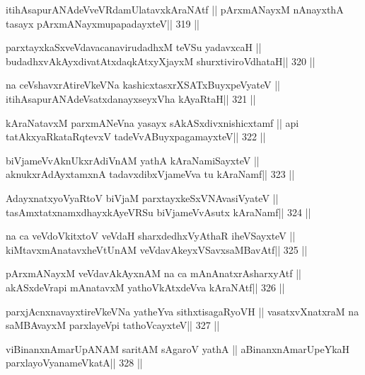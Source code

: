 \begin{shl}
itihAsapurANAdeVveVRdamUlatavxkAraNAtf ||
pArxmANayxM nAnayxthA tasayx pArxmANayxmupapadayxteV\hfill || 319 ||
\end{shl}

\begin{shl}
parxtayxkaSxveVdavacanavirudadhxM teVSu yadavxcaH ||
budadhxvAkAyxdivatAtxdaqkAtxyXjayxM shurxtiviroVdhataH\hfill || 320 ||
\end{shl}

\begin{shl}
na ceVshavxrAtireVkeVNa kashicxtasxrXSATx\s BuyxpeVyateV ||
itihAsapurANAdeVsatxdanayxseyxVha kAyaRtaH\hfill || 321 ||
\end{shl}

\begin{shl}
kAraNatavxM parxmANeVna yasayx sAkASxdivxnishicxtamf ||
api tatAkxyaRkataRqtevxV tadeVvABuyxpagamayxteV\hfill || 322 ||
\end{shl}

\begin{shl}
biVjameVvAknUkxrAdiVnAM yathA kAraNamiSayxteV ||
aknukxrAdAyxtamxnA tadavxdibxVjameVva tu kAraNamf\hfill || 323 ||
\end{shl}

\begin{shl}
AdayxnatxyoVyaRtoV biVjaM parxtayxkeSxVNAvasiVyateV ||
tasAmxtatxnamxdhayxkAyeVRSu biVjameVvAsutx kAraNamf\hfill || 324 ||
\end{shl}

\begin{shl}
na ca veVdoVkitxtoV veVdaH sharxdedhxVyAthaR iheVSayxteV ||
kiMtavxmAnatavxheVtUnAM veVdavAkeyxVSavxsaMBavAtf\hfill || 325 ||
\end{shl}

\begin{shl}
pArxmANayxM veVdavAkAyxnAM na ca mAnAnatxrAsharxyAtf ||
akASxdeVrapi mAnatavxM yathoVkAtxdeVva kAraNAtf\hfill || 326 ||
\end{shl}

\begin{shl}
parxjAcnxnavayxtireVkeVNa yatheYva sithxtisagaRyoVH ||
vasatxvXnatxraM na saMBAvayxM parxlayeV\s pi tathoVcayxteV\hfill || 327 ||
\end{shl}

\begin{shl}
viBinanxnAmarUpANAM saritAM sAgaroV yathA ||
aBinanxnAmarUpeYkaH parxlayoV\s yanameVkatA\hfill || 328 ||
\end{shl}

